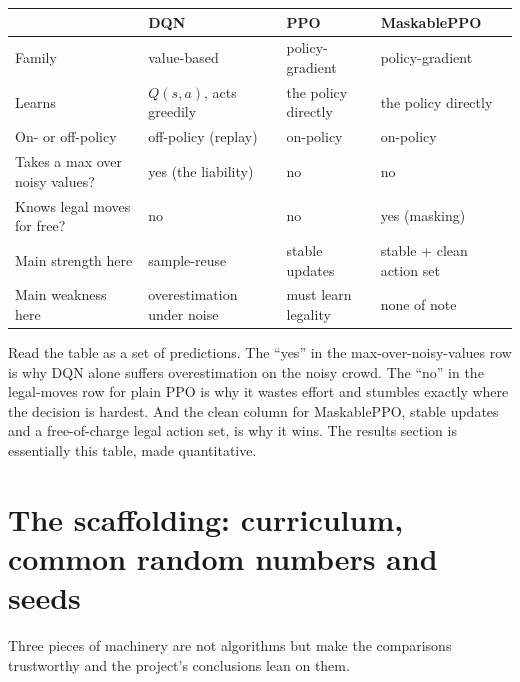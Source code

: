 \documentclass[11pt]{article}
\begin{document}
\renewcommand{\arraystretch}{1.35}
\begin{center}
\begin{tabular}{p{3.2cm} p{3.5cm} p{3.5cm} p{3.5cm}}
\toprule
 & \textbf{DQN} & \textbf{PPO} & \textbf{MaskablePPO} \\
\midrule
Family & value-based & policy-gradient & policy-gradient \\
Learns & $Q(s,a)$, acts greedily & the policy directly & the policy directly \\
On- or off-policy & off-policy (replay) & on-policy & on-policy \\
Takes a max over noisy values? & yes (the liability) & no & no \\
Knows legal moves for free? & no & no & yes (masking) \\
Main strength here & sample-reuse & stable updates & stable + clean action set \\
Main weakness here & overestimation under noise & must learn legality & none of note \\
\bottomrule
\end{tabular}
\end{center}

Read the table as a set of predictions. The ``yes'' in the max-over-noisy-values row is why
DQN alone suffers overestimation on the noisy crowd. The ``no'' in the legal-moves row for
plain PPO is why it wastes effort and stumbles exactly where the decision is hardest. And the
clean column for MaskablePPO, stable updates and a free-of-charge legal action set, is why it
wins. The results section is essentially this table, made quantitative.

\section{The scaffolding: curriculum, common random numbers and seeds}

Three pieces of machinery are not algorithms but make the comparisons trustworthy and the
project's conclusions lean on them.
\end{document}
